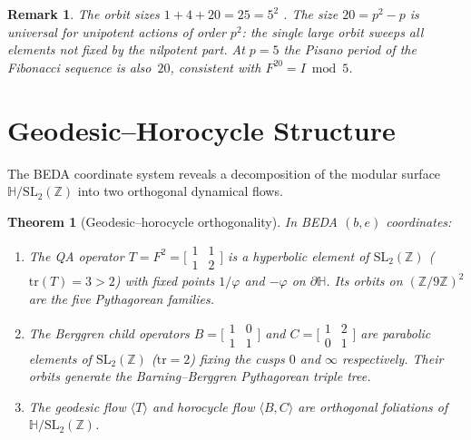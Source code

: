 \documentclass[12pt]{article}
\newtheorem{theorem}{Theorem}
\newtheorem{remark}{Remark}
\begin{document}
\begin{remark}
The orbit sizes $1+4+20=25=5^2$ \checkmark.  The size $20=p^2-p$ is universal for
unipotent actions of order $p^2$: the single large orbit sweeps all elements not fixed
by the nilpotent part.  At $p=5$ the Pisano period of the Fibonacci sequence is also~$20$,
consistent with $F^{20}=I\bmod5$.
\end{remark}

\section{Geodesic--Horocycle Structure}

The BEDA coordinate system reveals a decomposition of the modular surface
$\mathbb{H}/\mathrm{SL}_2(\mathbb{Z})$ into two orthogonal dynamical flows.

\begin{theorem}[Geodesic--horocycle orthogonality]\label{thm:geo-horo}
In BEDA $(b,e)$ coordinates:
\begin{enumerate}
\item The QA operator $T=F^2=\bigl[\begin{smallmatrix}1&1\\1&2\end{smallmatrix}\bigr]$
  is a \emph{hyperbolic} element of $\mathrm{SL}_2(\mathbb{Z})$ ($\mathrm{tr}(T)=3>2$)
  with fixed points $1/\varphi$ and $-\varphi$ on $\partial\mathbb{H}$.
  Its orbits on $(\mathbb{Z}/9\mathbb{Z})^2$ are the five Pythagorean families.
\item The Berggren child operators
  $B=\bigl[\begin{smallmatrix}1&0\\1&1\end{smallmatrix}\bigr]$ and
  $C=\bigl[\begin{smallmatrix}1&2\\0&1\end{smallmatrix}\bigr]$
  are \emph{parabolic} elements of $\mathrm{SL}_2(\mathbb{Z})$ ($\mathrm{tr}=2$)
  fixing the cusps $0$ and $\infty$ respectively.
  Their orbits generate the Barning--Berggren Pythagorean triple tree.
\item The geodesic flow $\langle T\rangle$ and horocycle flow $\langle B,C\rangle$
  are orthogonal foliations of $\mathbb{H}/\mathrm{SL}_2(\mathbb{Z})$.
\end{enumerate}
\end{theorem}
\end{document}
